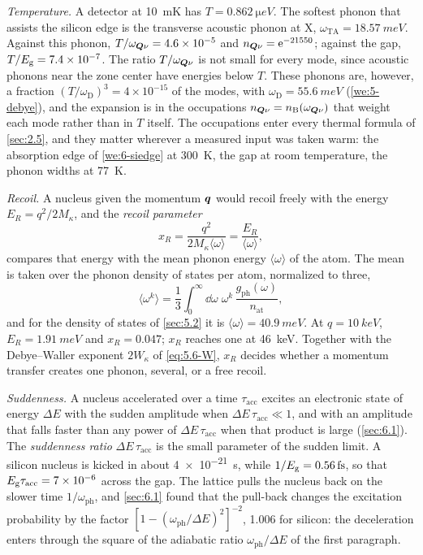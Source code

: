 \emph{Temperature.} A detector at \SI{10}{mK} has $T = \SI{0.862}{\micro eV}$. The softest phonon that assists the silicon edge is the transverse acoustic phonon at X, $\omega_{\mathrm{TA}} = \SI{18.57}{meV}$. Against this phonon, $T/\omega_{\bm{Q}\nu} = 4.6\times10^{-5}$ and $n_{\bm{Q}\nu} = \mathrm{e}^{-21550}$; against the gap, $T/E_{\mathrm{g}} = 7.4\times10^{-7}$. The ratio $T/\omega_{\bm{Q}\nu}$ is not small for every mode, since acoustic phonons near the zone center have energies below $T$. These phonons are, however, a fraction $(T/\omega_{\mathrm{D}})^3 = 4\times10^{-15}$ of the modes, with $\omega_{\mathrm{D}} = \SI{55.6}{meV}$ (\cref{we:5-debye}), and the expansion is in the occupations $n_{\bm{Q}\nu} = n_{\mathrm{B}}(\omega_{\bm{Q}\nu})$ that weight each mode rather than in $T$ itself. The occupations enter every thermal formula of \cref{sec:2.5}, and they matter wherever a measured input was taken warm: the absorption edge of \cref{we:6-siedge} at \SI{300}{K}, the gap at room temperature, the phonon widths at \SI{77}{K}.

\emph{Recoil.} A nucleus given the momentum $\bm{q}$ would recoil freely with the energy $E_R = q^2/2M_\kappa$, and the \emph{recoil parameter}
\begin{equation}
  x_R = \frac{q^2}{2M_\kappa\langle\omega\rangle} = \frac{E_R}{\langle\omega\rangle} ,
  \label{eq:8.5-xR}
\end{equation}
compares that energy with the mean phonon energy $\langle\omega\rangle$ of the atom. The mean is taken over the phonon density of states per atom, normalized to three,
\begin{equation*}
  \langle\omega^k\rangle = \frac13\int_0^\infty\dd\omega\;\omega^k\,\frac{g_{\mathrm{ph}}(\omega)}{n_{\mathrm{at}}} ,
\end{equation*}
and for the density of states of \cref{sec:5.2} it is $\langle\omega\rangle = \SI{40.9}{meV}$. At $q = \SI{10}{keV}$, $E_R = \SI{1.91}{meV}$ and $x_R = 0.047$; $x_R$ reaches one at \SI{46}{keV}. Together with the Debye--Waller exponent $2W_\kappa$ of \cref{eq:5.6-W}, $x_R$ decides whether a momentum transfer creates one phonon, several, or a free recoil.

\emph{Suddenness.} A nucleus accelerated over a time $\tau_{\mathrm{acc}}$ excites an electronic state of energy $\Delta E$ with the sudden amplitude when $\Delta E\,\tau_{\mathrm{acc}} \ll 1$, and with an amplitude that falls faster than any power of $\Delta E\,\tau_{\mathrm{acc}}$ when that product is large (\cref{sec:6.1}). The \emph{suddenness ratio} $\Delta E\,\tau_{\mathrm{acc}}$ is the small parameter of the sudden limit. A silicon nucleus is kicked in about \SI{4e-21}{s}, while $1/E_{\mathrm{g}} = \SI{0.56}{fs}$, so that $E_{\mathrm{g}}\tau_{\mathrm{acc}} = 7\times10^{-6}$ across the gap. The lattice pulls the nucleus back on the slower time $1/\omega_{\mathrm{ph}}$, and \cref{sec:6.1} found that the pull-back changes the excitation probability by the factor $[1 - (\omega_{\mathrm{ph}}/\Delta E)^2]^{-2}$, 1.006 for silicon: the deceleration enters through the square of the adiabatic ratio $\omega_{\mathrm{ph}}/\Delta E$ of the first paragraph.

